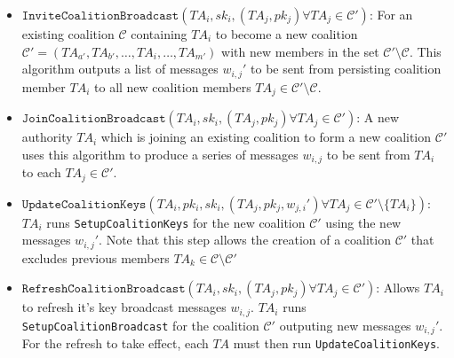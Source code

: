 \documentclass[10pt]{llncs}
\newcommand{\C}{\mathcal{C}}
\newcommand{\TA}{\mathit{TA}}
\newcommand{\pk}{\mathit{pk}}
\newcommand{\sk}{\mathit{sk}}
\begin{document}
\begin{itemize}
%

\item $\texttt{InviteCoalitionBroadcast}(\TA_i,sk_i,(\TA_j,pk_j) \forall \TA_j \in \C')$: For an existing coalition $\C$ containing $\TA_i$ to become a new coalition $\C'=(\TA_{a'},\TA_{b'},\ldots,\TA_{i}, \ldots, \TA_{m'})$ with new members in the set $\C' \setminus \C$. This algorithm outputs a list of messages $w_{i,j}'$ to be sent from persisting coalition member $\TA_i$ to all new coalition members $\TA_j \in \C' \setminus \C$.
\medskip

\item $\texttt{JoinCoalitionBroadcast}(\TA_i,sk_{i},(\TA_j,pk_j) \forall \TA_j \in \C')$: A new authority $\TA_i$ which is joining an existing coalition to form a new coalition $\C'$ uses this algorithm to produce a series of messages $w_{i,j}$ to be sent from $\TA_{i}$ to each $\TA_j \in \C'$.
\medskip

\item $\texttt{UpdateCoalitionKeys}(\TA_i,pk_i, sk_i,(\TA_j,pk_j, w_{j,i}') \forall \TA_j \in \C' \setminus \{\TA_i\})$: $\TA_i$ runs \texttt{SetupCoalitionKeys} for the new coalition $\C'$ using the new messages $w_{i,j}'$. Note that this step allows the creation of a coalition $\C'$ that excludes previous members $\TA_k \in \C \setminus \C'$
\medskip

\item $\texttt{RefreshCoalitionBroadcast}(\TA_i, sk_i,(\TA_j,pk_j) \forall \TA_j \in \C')$: Allows $\TA_i$ to refresh it's key broadcast messages $w_{i,j}$. $\TA_i$ runs \texttt{SetupCoalitionBroadcast} for the coalition $\C'$ outputing new messages $w_{i,j}'$. For the refresh to take effect, each $\TA$ must then run \texttt{UpdateCoalitionKeys}.



\end{itemize}
\end{document}
